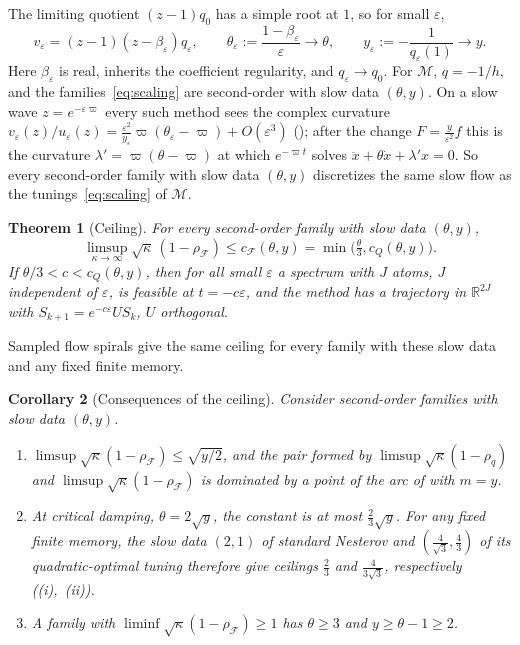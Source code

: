 \documentclass[11pt]{article}
\newtheorem{theorem}{Theorem}[section]
\newtheorem{corollary}[theorem]{Corollary}
\theoremstyle{definition}
\theoremstyle{remark}
\newcommand{\R}{\mathbb R}
\newcommand{\cF}{\mathcal F}
\newcommand{\cM}{\mathcal M}
\newcommand{\rhoF}{\rho_{\cF}}
\newcommand{\cQ}{c_{Q}}
\newcommand{\cFF}{c_{\cF}}
\begin{document}
The limiting quotient \((z-1)q_0\) has a simple root at \(1\), so for small
\(\varepsilon\),
\[
v_\varepsilon=(z-1)(z-\beta_\varepsilon)q_\varepsilon,\qquad
\theta_\varepsilon:=\frac{1-\beta_\varepsilon}{\varepsilon}\to\theta,\qquad
y_\varepsilon:=-\frac1{q_\varepsilon(1)}\to y.
\]
Here \(\beta_\varepsilon\) is real, inherits the coefficient regularity,
and \(q_\varepsilon\to q_0\).  For \(\cM\), \(q=-1/h\), and the families~\eqref{eq:scaling} are
second-order with slow data \((\theta,y)\).  On a slow wave \(z=e^{-\varepsilon\varpi}\) every such method sees the complex curvature
\(v_\varepsilon(z)/u_\varepsilon(z)=\frac{\varepsilon^2}{y_\varepsilon}\varpi(\theta_\varepsilon-\varpi)+O(\varepsilon^3)\) (); after the change \(F=\frac y{\varepsilon^2}f\) this is the
curvature \(\lambda'=\varpi(\theta-\varpi)\) at which \(e^{-\varpi t}\) solves \(\ddot x+\theta\dot x+\lambda'x=0\).  So every second-order family
with slow data \((\theta,y)\) discretizes the same slow flow as the tunings~\eqref{eq:scaling} of \(\cM\).

\begin{theorem}[Ceiling]\label{thm:ceiling}
For every second-order family with slow data \((\theta,y)\),
\[
\limsup_{\kappa\to\infty}\sqrt\kappa\,(1-\rhoF)\le\cFF(\theta,y)=\min\bigl(\tfrac\theta3,\cQ(\theta,y)\bigr).
\]
If \(\theta/3<c<\cQ(\theta,y)\), then for all small \(\varepsilon\) a spectrum with \(J\) atoms, \(J\)
independent of \(\varepsilon\), is feasible at \(t=-c\varepsilon\), and the method has a trajectory in
\(\R^{2J}\) with \(S_{k+1}=e^{-c\varepsilon}US_k\), \(U\) orthogonal.
\end{theorem}

Sampled flow spirals give the same ceiling for every family with these slow
data and any fixed finite memory.

\begin{corollary}[Consequences of the ceiling]\label{cor:ceiling}
Consider second-order families with slow data \((\theta,y)\).
\begin{enumerate}[label=\textup{(\roman*)}]
\item \(\limsup\sqrt\kappa(1-\rhoF)\le\sqrt{y/2}\), and the pair formed by \(\limsup\sqrt\kappa(1-\rho_q)\) and
\(\limsup\sqrt\kappa(1-\rhoF)\) is dominated by a point of the arc of  with \(m=y\).
\item At critical damping, \(\theta=2\sqrt y\), the constant is at most \(\frac23\sqrt y\).
For any fixed finite memory, the slow data \((2,1)\) of standard Nesterov and
\((\frac4{\sqrt3},\frac43)\) of its quadratic-optimal tuning therefore give ceilings
\(\frac23\) and \(\frac4{3\sqrt3}\), respectively ((i),~(ii)).
\item A family with \(\liminf\sqrt\kappa(1-\rhoF)\ge1\) has \(\theta\ge3\) and \(y\ge\theta-1\ge2\).
\end{enumerate}
\end{corollary}
\end{document}
